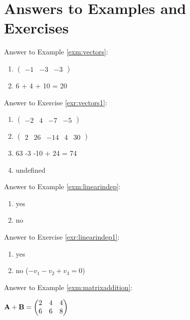 \documentclass[]{book}
\providecommand{\tightlist}{%
  \setlength{\itemsep}{0pt}\setlength{\parskip}{0pt}}
\theoremstyle{definition}
\theoremstyle{definition}
\theoremstyle{definition}
\theoremstyle{remark}
\begin{document}
\section*{Answers to Examples and
Exercises}\label{answers-to-examples-and-exercises-3}

Answer to Example \ref{exm:vectors}:

\begin{enumerate}
\def\labelenumi{\arabic{enumi}.}
\tightlist
\item
  \(\begin{pmatrix} -1 &-3&-3 \end{pmatrix}\)
\item
  6 + 4 + 10 = 20
\end{enumerate}

Answer to Exercise \ref{exr:vectors1}:

\begin{enumerate}
\def\labelenumi{\arabic{enumi}.}
\tightlist
\item
  \(\begin{pmatrix} -2 &4&-7&-5 \end{pmatrix}\)
\item
  \(\begin{pmatrix} 2 &26&-14&4&30 \end{pmatrix}\)
\item
  63 -3 -10 + 24 = 74
\item
  undefined
\end{enumerate}

Answer to Example \ref{exm:linearindep}:

\begin{enumerate}
\def\labelenumi{\arabic{enumi}.}
\tightlist
\item
  yes
\item
  no
\end{enumerate}

Answer to Exercise \ref{exr:linearindep1}:

\begin{enumerate}
\def\labelenumi{\arabic{enumi}.}
\tightlist
\item
  yes
\item
  no (\(-v_1 -v_2 + v_3 = 0\))
\end{enumerate}

Answer to Example \ref{exm:matrixaddition}:

\({\bf A+B}=\begin{pmatrix} 2 & 4 & 4 \\ 6 & 6 & 8 \end{pmatrix}\)
\end{document}
